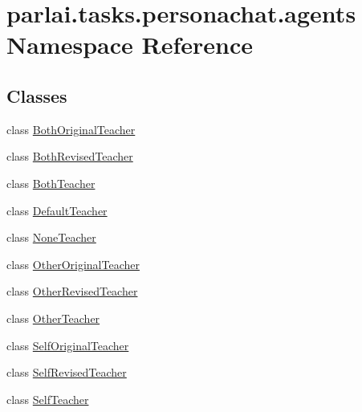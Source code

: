 \hypertarget{namespaceparlai_1_1tasks_1_1personachat_1_1agents}{}\section{parlai.\+tasks.\+personachat.\+agents Namespace Reference}
\label{namespaceparlai_1_1tasks_1_1personachat_1_1agents}
\subsection*{Classes}
\begin{DoxyCompactItemize}
\item 
class \hyperlink{classparlai_1_1tasks_1_1personachat_1_1agents_1_1BothOriginalTeacher}{Both\+Original\+Teacher}
\item 
class \hyperlink{classparlai_1_1tasks_1_1personachat_1_1agents_1_1BothRevisedTeacher}{Both\+Revised\+Teacher}
\item 
class \hyperlink{classparlai_1_1tasks_1_1personachat_1_1agents_1_1BothTeacher}{Both\+Teacher}
\item 
class \hyperlink{classparlai_1_1tasks_1_1personachat_1_1agents_1_1DefaultTeacher}{Default\+Teacher}
\item 
class \hyperlink{classparlai_1_1tasks_1_1personachat_1_1agents_1_1NoneTeacher}{None\+Teacher}
\item 
class \hyperlink{classparlai_1_1tasks_1_1personachat_1_1agents_1_1OtherOriginalTeacher}{Other\+Original\+Teacher}
\item 
class \hyperlink{classparlai_1_1tasks_1_1personachat_1_1agents_1_1OtherRevisedTeacher}{Other\+Revised\+Teacher}
\item 
class \hyperlink{classparlai_1_1tasks_1_1personachat_1_1agents_1_1OtherTeacher}{Other\+Teacher}
\item 
class \hyperlink{classparlai_1_1tasks_1_1personachat_1_1agents_1_1SelfOriginalTeacher}{Self\+Original\+Teacher}
\item 
class \hyperlink{classparlai_1_1tasks_1_1personachat_1_1agents_1_1SelfRevisedTeacher}{Self\+Revised\+Teacher}
\item 
class \hyperlink{classparlai_1_1tasks_1_1personachat_1_1agents_1_1SelfTeacher}{Self\+Teacher}
\end{DoxyCompactItemize}
